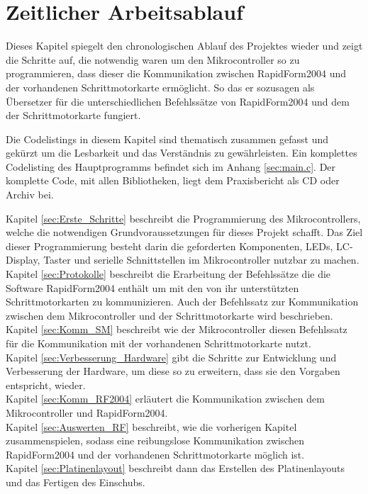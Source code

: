 \chapter{Zeitlicher Arbeitsablauf}
\label{cha:Arbeit}
Dieses Kapitel spiegelt den chronologischen Ablauf des Projektes wieder und zeigt die Schritte auf, die notwendig waren um den Mikrocontroller so zu programmieren, dass dieser die Kommunikation zwischen RapidForm2004 und der vorhandenen Schrittmotorkarte ermöglicht. So das er sozusagen als Übersetzer für die unterschiedlichen Befehlssätze von RapidForm2004 und dem der Schrittmotorkarte fungiert.
\begin{Tipp}Die Codelistings in diesem Kapitel sind thematisch zusammen gefasst und gekürzt um die Lesbarkeit und das Verständnis zu gewährleisten. Ein komplettes Codelisting des Hauptprogramms befindet sich im Anhang \ref{sec:main.c}. Der komplette Code, mit allen Bibliotheken, liegt dem Praxisbericht als CD oder Archiv bei.\end{Tipp}
Kapitel \ref{sec:Erste_Schritte} beschreibt die Programmierung des Mikrocontrollers, welche die notwendigen Grundvoraussetzungen für dieses Projekt schafft. Das Ziel dieser Programmierung besteht darin die geforderten Komponenten, LEDs, LC-Display, Taster und serielle Schnittstellen im Mikrocontroller nutzbar zu machen.\\
Kapitel \ref{sec:Protokolle} beschreibt die Erarbeitung der Befehlssätze die die Software RapidForm2004 enthält um mit den von ihr unterstützten Schrittmotorkarten zu kommunizieren. Auch der Befehlssatz zur Kommunikation zwischen dem Mikrocontroller und der Schrittmotorkarte wird beschrieben.\\
Kapitel \ref{sec:Komm_SM} beschreibt wie der Mikrocontroller diesen Befehlssatz für die Kommunikation mit der vorhandenen Schrittmotorkarte nutzt.\\
Kapitel \ref{sec:Verbesserung_Hardware} gibt die Schritte zur Entwicklung und Verbesserung der Hardware, um diese so zu erweitern, dass sie den Vorgaben entspricht, wieder.\\
Kapitel \ref{sec:Komm_RF2004} erläutert die Kommunikation zwischen dem Mikrocontroller und RapidForm2004. \\
Kapitel \ref{sec:Auswerten_RF} beschreibt, wie die vorherigen Kapitel zusammenspielen, sodass eine reibungslose Kommunikation zwischen RapidForm2004 und der vorhandenen Schrittmotorkarte möglich ist.\\
Kapitel \ref{sec:Platinenlayout} beschreibt dann das Erstellen des Platinenlayouts und das Fertigen des Einschubs.

